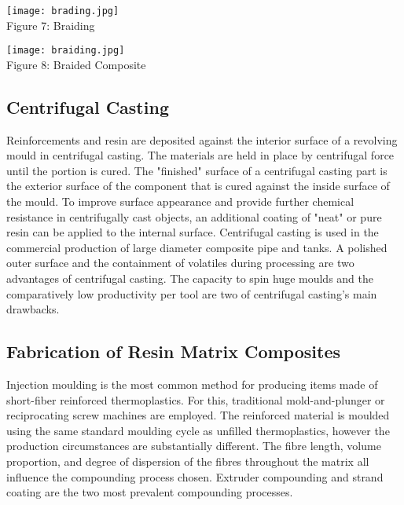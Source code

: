 \documentclass{article}
\begin{document}
\begin{multicols}{2}
\begin{center}
\texttt{[image: brading.jpg]}\\

{\small Figure 7: Braiding}
\end{center}

\begin{center}
\texttt{[image: braiding.jpg]}\\

{\small Figure 8: Braided Composite}
\end{center}

\subsection{Centrifugal Casting}

Reinforcements and resin are deposited against the interior surface of a revolving mould in centrifugal casting. The materials are held in place by centrifugal force until the portion is cured. The "finished" surface of a centrifugal casting part is the exterior surface of the component that is cured against the inside surface of the mould. To improve surface appearance and provide further chemical resistance in centrifugally cast objects, an additional coating of "neat" or pure resin can be applied to the internal surface. Centrifugal casting is used in the commercial production of large diameter composite pipe and tanks. A polished outer surface and the containment of volatiles during processing are two advantages of centrifugal casting. The capacity to spin huge moulds and the comparatively low productivity per tool are two of centrifugal casting's main drawbacks.

\subsection{Fabrication of Resin Matrix Composites}

Injection moulding is the most common method for producing items made of short-fiber reinforced thermoplastics. For this, traditional mold-and-plunger or reciprocating screw machines are employed. The reinforced material is moulded using the same standard moulding cycle as unfilled thermoplastics, however the production circumstances are substantially different. The fibre length, volume proportion, and degree of dispersion of the fibres throughout the matrix all influence the compounding process chosen. Extruder compounding and strand coating are the two most prevalent compounding processes.


\end{multicols}
\end{document}
